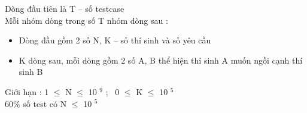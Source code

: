 Dòng đầu tiên là T – số testcase
\\Mỗi nhóm dòng trong số T nhóm dòng sau :
\begin{itemize}
	\item Dòng đầu gồm 2 số N, K – số thí sinh và số yêu cầu
	\item K dòng sau, mỗi dòng gồm 2 số A, B thể hiện thí sinh A muốn ngồi cạnh thí sinh B
\end{itemize}

Giới hạn : 1  $\le$  N  $\le$  10 $^ 9 $ ;  0  $\le$  K  $\le$  10 $^ 5 $
\\60\% số test có N  $\le$  10 $^ 5 $

\
